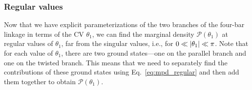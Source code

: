 \subsubsection{Regular values}

Now that we have explicit parameterizations of the two branches of the four-bar linkage in terms of the CV $\theta_{1}$, we can find the marginal density $\mathscr{P}(\theta_{1})$ at regular values of $\theta_{1}$, far from the singular values, i.e., for $0 \ll \lvert\theta_{1}\rvert \ll \pi$.
Note that for each value of $\theta_{1}$, there are two ground states---one on the parallel branch and one on the twisted branch.
This means that we need to separately find the contributions of these ground states using Eq.~\eqref{eq:mpd_regular} and then add them together to obtain $\mathscr{P}(\theta_{1})$.

